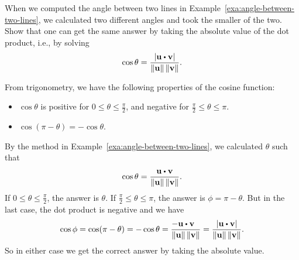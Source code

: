 \begin{enumialphparenastyle}
\begin{ex}\label{ex:angle-lines}
  When we computed the angle between two lines in
  Example~\ref{exa:angle-between-two-lines}, we calculated two
  different angles and took the smaller of the two. Show that one can
  get the same answer by taking the absolute value of the dot product,
  i.e., by solving
  \begin{equation*}
    \cos\theta =
    \frac{\abs{\vect{u}\dotprod\vect{v}}}{\norm{\vect{u}}\norm{\vect{v}}}.
  \end{equation*}
  \begin{sol}
    From trigonometry, we have the following properties of the cosine
    function:
    \begin{itemize}
    \item $\cos\theta$ is positive for $0\leq\theta\leq\frac{\pi}{2}$,
      and negative for $\frac{\pi}{2}\leq\theta\leq\pi$. 
    \item $\cos(\pi-\theta) = -\cos\theta$.
    \end{itemize}
    By the method in Example~\ref{exa:angle-between-two-lines}, we
    calculated $\theta$ such that
    \begin{equation*}
      \cos\theta =
      \frac{\vect{u}\dotprod\vect{v}}{\norm{\vect{u}}\norm{\vect{v}}}.
    \end{equation*}
    If $0\leq\theta\leq\frac{\pi}{2}$, the answer is $\theta$. If
    $\frac{\pi}{2}\leq\theta\leq\pi$, the answer is $\phi=\pi-\theta$.
    But in the last case, the dot product is negative and we have
    \begin{equation*}
      \cos\phi = \cos(\pi-\theta) = -\cos\theta = \frac{-\vect{u}\dotprod\vect{v}~~}{\norm{\vect{u}}\norm{\vect{v}}}
      =
      \frac{\abs{\vect{u}\dotprod\vect{v}}}{\norm{\vect{u}}\norm{\vect{v}}}.
    \end{equation*}
    So in either case we get the correct answer by taking the absolute
    value. 
  \end{sol}
\end{ex}

\end{enumialphparenastyle}
